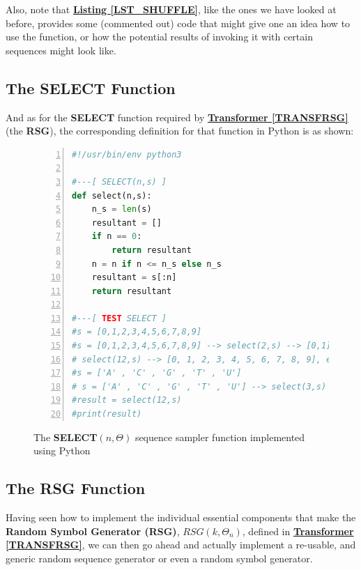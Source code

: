 \documentclass[a4paper, 18pt]{book} %
\begin{document}
Also, note that \textbf{\hyperref[LST_SHUFFLE]{Listing \ref{LST_SHUFFLE}}}, like the ones we have looked at before, provides some (commented out) code that might give one an idea how to use the function, or how the potential results of invoking it with certain sequences might look like.



\subsection{The SELECT Function}

And as for the \textbf{SELECT} function required by \textbf{\hyperref[TRANSFRSG]{Transformer \ref{TRANSFRSG}}} (the \textbf{RSG}), the corresponding definition for that function in Python is as shown:

\begin{figure}[H]
  \begin{center}
  \begin{lstlisting}[caption={The SELECT}, label={LST_SELECT}, language=Python, frame=single, numbers=left, basicstyle=\ttfamily,  commentstyle=\color{blue}]
#!/usr/bin/env python3

#---[ SELECT(n,s) ]
def select(n,s):
    n_s = len(s)
    resultant = []
    if n == 0:
        return resultant
    n = n if n <= n_s else n_s
    resultant = s[:n]
    return resultant

#---[ TEST SELECT ]
#s = [0,1,2,3,4,5,6,7,8,9]
#s = [0,1,2,3,4,5,6,7,8,9] --> select(2,s) --> [0,1], 
# select(12,s) --> [0, 1, 2, 3, 4, 5, 6, 7, 8, 9], etc.
#s = ['A' , 'C' , 'G' , 'T' , 'U']
# s = ['A' , 'C' , 'G' , 'T' , 'U'] --> select(3,s) --> ['A', 'C', 'G'], etc.
#result = select(12,s)
#print(result)
\end{lstlisting}
  \end{center}
  \caption{The \textbf{SELECT}$(n,\Theta)$ sequence sampler function implemented using Python}
\end{figure}



\subsection{The RSG Function}
\label{SECRSGFUNC}

Having seen how to implement the individual essential components that make the \textbf{Random Symbol Generator (RSG)}, $RSG(k,\Theta_n)$, defined in \textbf{\hyperref[TRANSFRSG]{Transformer \ref{TRANSFRSG}}}, we can then go ahead and actually implement a re-usable, and generic random sequence  generator or even a random symbol generator. 
\end{document}
